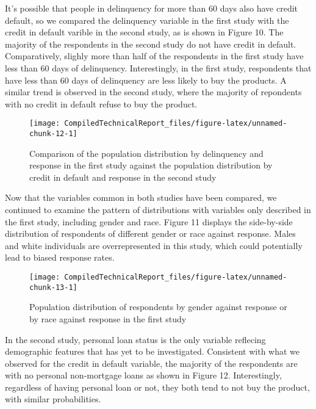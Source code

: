 \documentclass[]{article}
\begin{document}
\newpage

It's possible that people in delinquency for more than 60 days also have
credit default, so we compared the delinquency variable in the first
study with the credit in default varible in the second study, as is
shown in Figure 10. The majority of the respondents in the second study
do not have credit in default. Comparatively, slighly more than half of
the respondents in the first study have less than 60 days of
delinquency. Interestingly, in the first study, respondents that have
less than 60 days of delinquency are less likely to buy the products. A
similar trend is observed in the second study, where the majority of
repondents with no credit in default refuse to buy the product.

\begin{figure}

{\centering \texttt{[image: CompiledTechnicalReport\_files/figure-latex/unnamed-chunk-12-1]} 

}

\caption{Comparison of the population distribution by delinquency and response in the first study against the population distribution by credit in default and response in the second study}\label{fig:unnamed-chunk-12}
\end{figure}

Now that the variables common in both studies have been compared, we
continued to examine the pattern of distributions with variables only
described in the first study, including gender and race. Figure 11
displays the side-by-side distribution of respondents of different
gender or race against response. Males and white individuals are
overrepresented in this study, which could potentially lead to biased
response rates.

\begin{figure}

{\centering \texttt{[image: CompiledTechnicalReport\_files/figure-latex/unnamed-chunk-13-1]} 

}

\caption{Population distribution of respondents by gender against response or by race against response in the first study}\label{fig:unnamed-chunk-13}
\end{figure}

In the second study, personal loan status is the only variable reflecing
demographic features that has yet to be investigated. Consistent with
what we observed for the credit in default variable, the majority of the
respondents are with no personal non-mortgage loans as shown in Figure
12. Interestingly, regardless of having personal loan or not, they both
tend to not buy the product, with similar probabilities.
\end{document}

